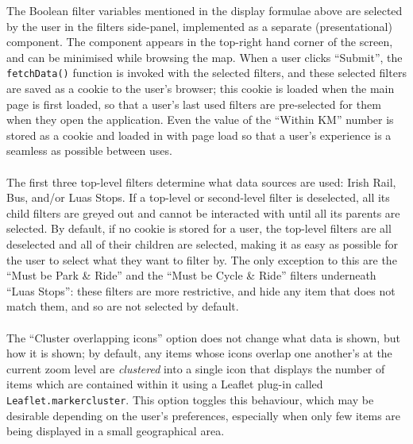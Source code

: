 \documentclass[a4paper,11pt]{report}
\begin{document}
The Boolean filter variables mentioned in the display formulae above are selected by the user in the filters side-panel, implemented as a separate (presentational) component.
The component appears in the top-right hand corner of the screen, and can be minimised while browsing the map.
When a user clicks ``Submit'', the \texttt{fetchData()} function is invoked with the selected filters, and these selected filters are saved as a cookie to the user's browser; 
this cookie is loaded when the main page is first loaded, so that a user's last used filters are pre-selected for them when they open the application.
Even the value of the ``Within KM'' number is stored as a cookie and loaded in with page load so that a user's experience is a seamless as possible between uses.
\\\\
The first three top-level filters determine what data sources are used: Irish Rail, Bus, and/or Luas Stops.
If a top-level or second-level filter is deselected, all its child filters are greyed out and cannot be interacted with until all its parents are selected. 
By default, if no cookie is stored for a user, the top-level filters are all deselected and all of their children are selected, making it as easy as possible for the user to select what they want to filter by.
The only exception to this are the ``Must be Park \& Ride'' and the ``Must be Cycle \& Ride'' filters underneath ``Luas Stops'': these filters are more restrictive, and hide any item that does not match them, and so are not selected by default.
\\\\
The ``Cluster overlapping icons'' option does not change what data is shown, but how it is shown;
by default, any items whose icons overlap one another's at the current zoom level are \textit{clustered} into a single icon that displays the number of items which are contained within it using a Leaflet plug-in called \verb|Leaflet.markercluster|\supercite{leaflet_markercluster}.
This option toggles this behaviour, which may be desirable depending on the user's preferences, especially when only few items are being displayed in a small geographical area. 
\end{document}
